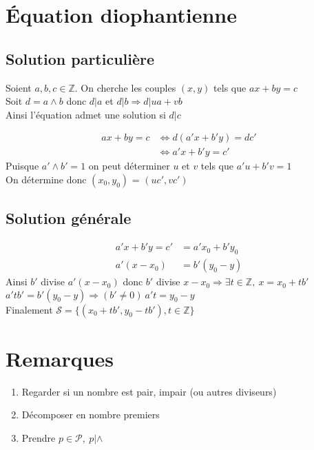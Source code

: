 \documentclass[fleqn]{article}
\theoremstyle{definition} \newtheorem*{defi}{D\'efinition}
\theoremstyle{definition} \newtheorem*{theo}{Th\'eor\`eme}
\theoremstyle{definition} \newtheorem*{coro}{Corollaire}
\theoremstyle{remark} \newtheorem*{rqs}{Remarques}
\theoremstyle{definition} \newtheorem*{prop}{Propri\'et\'e}
\begin{document}
\section{\'Equation diophantienne}

\subsection{Solution particuli\`ere}
Soient $a,b,c \in \mathbb{Z}$. On cherche les couples $(x,y)$ tels que $ax + by = c$ \\
Soit $d = a \land b$ donc $d |a$ et $d|b \Rightarrow d|ua + vb$ \\
Ainsi l'\'equation admet une solution si $d|c$

\begin{align*}
	ax + by = c &\Leftrightarrow d(a'x + b'y) = dc' \\
				&\Leftrightarrow a'x + b'y = c'
\end{align*}
Puisque $a' \land b' = 1$ on peut d\'eterminer $u$ et $v$ tels que $a'u + b'v = 1$\\
On d\'etermine donc $(x_0, y_0)$ = $(u c', v c')$

\subsection{Solution g\'en\'erale}

\begin{align*}
	a'x + b'y = c' &= a'x_0 + b'y_0\\
	a'(x - x_0) &= b'(y_0 - y)
\end{align*}
Ainsi $b'$ divise $a'(x-x_0)$ donc $b'$ divise $x-x_0 \Rightarrow \exists t \in \mathbb{Z},\ x = x_0 + tb'$\\
$a'tb' = b'(y_0 -y) \Rightarrow (b' \neq 0)\ a't = y_0 - y$\\
Finalement $\mathscr{S} = \{(x_0 + tb', y_0 - tb'), t \in \mathbb{Z}\}$


\section{Remarques}
\begin{enumerate}
	\item Regarder si un nombre est pair, impair (ou autres diviseurs)
	\item D\'ecomposer en nombre premiers
	\item Prendre $p \in \mathcal{P},\ p | \land$
\end{enumerate}
\end{document}
